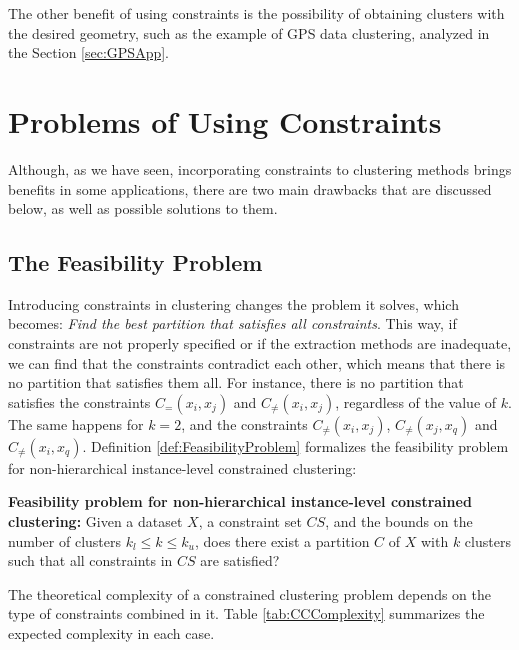 The other benefit of using constraints is the possibility of obtaining clusters with the desired geometry, such as the example of \acs{GPS} data clustering, analyzed in the Section \ref{sec:GPSApp}.

\section{Problems of Using Constraints} \label{sec:ConstraintsProblems}

Although, as we have seen, incorporating constraints to clustering methods brings benefits in some applications, there are two main drawbacks that are discussed below, as well as possible solutions to them.

\subsection{The Feasibility Problem} \label{sec:FeasibilityProblem}

Introducing constraints in clustering changes the problem it solves, which becomes: \textit{Find the best partition that satisfies all constraints}. This way, if constraints are not properly specified or if the extraction methods are inadequate, we can find that the constraints contradict each other, which means that there is no partition that satisfies them all. For instance, there is no partition that satisfies the constraints $C_=(x_i,x_j)$ and $C_{\neq}(x_i,x_j)$, regardless of the value of $k$. The same happens for $k = 2$, and the constraints $C_{\neq}(x_i, x_j)$, $C_{\neq}(x_j, x_q)$ and $C_{\neq}(x_i, x_q)$. Definition \ref{def:FeasibilityProblem} formalizes the feasibility problem for non-hierarchical instance-level constrained clustering:

\begin{definition}
	
	\textbf{Feasibility problem for non-hierarchical instance-level constrained clustering:} Given a dataset $X$, a constraint set $CS$, and the bounds on the number of clusters $k_l \leq k \leq k_u$, does there exist a partition $C$ of $X$ with $k$ clusters such that all constraints in $CS$ are satisfied? \cite{davidson2005clustering,davidson2007survey}
	
	\label{def:FeasibilityProblem}
	
\end{definition}

 The theoretical complexity of a constrained clustering problem depends on the type of constraints combined in it. Table \ref{tab:CCComplexity} summarizes the expected complexity in each case. 

